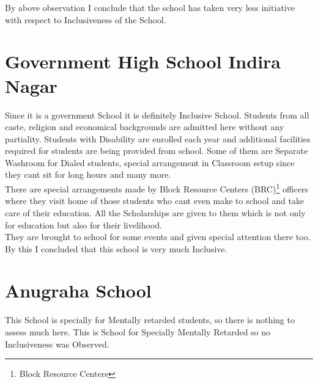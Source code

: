 By above observation I conclude that the school has taken very less initiative with respect to Inclusiveness of the School.

\section{Government High School Indira Nagar}

Since it is a government School it is definitely Inclusive School. Students from all caste, religion and economical backgrounds are admitted here without any partiality. Students with Disability are enrolled each year and additional facilities required for students are being provided from school. Some of them are Separate Washroom for Dialed students, special arrangement in Classroom setup since they cant sit for long hours and many more.\\

There are special arrangements made by Block Resource Centers (BRC)\footnote{Block Resource Centers} officers where they visit home of those students who cant even make to school and take care of their education. All the Scholarships are given to them which is not only for education but also for their livelihood.\\

They are brought to school for some events and given special attention there too. By this I concluded that this school is very much Inclusive.

\section{Anugraha School}
This School is specially for Mentally retarded students, so there is nothing to assess much here. This is School for Specially Mentally Retarded so no Inclusiveness was Observed.